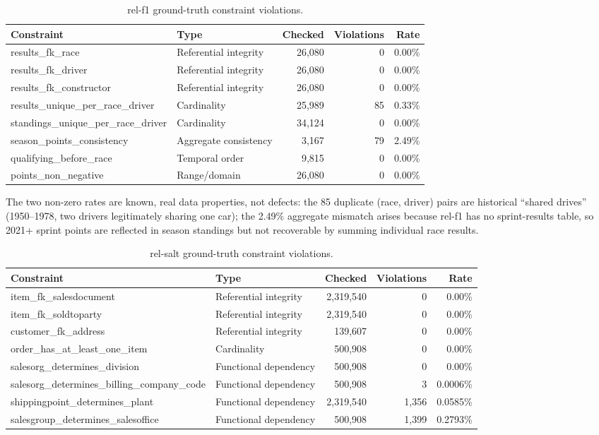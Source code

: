 \documentclass[11pt]{article}
\begin{document}
\begin{table}[h]
\centering
\small
\caption{rel-f1 ground-truth constraint violations.}
\begin{tabular}{@{} l l r r r @{}}
\toprule
\textbf{Constraint} & \textbf{Type} & \textbf{Checked} & \textbf{Violations} & \textbf{Rate} \\
\midrule
results\_fk\_race & Referential integrity & 26{,}080 & 0 & 0.00\% \\
results\_fk\_driver & Referential integrity & 26{,}080 & 0 & 0.00\% \\
results\_fk\_constructor & Referential integrity & 26{,}080 & 0 & 0.00\% \\
results\_unique\_per\_race\_driver & Cardinality & 25{,}989 & 85 & 0.33\% \\
standings\_unique\_per\_race\_driver & Cardinality & 34{,}124 & 0 & 0.00\% \\
season\_points\_consistency & Aggregate consistency & 3{,}167 & 79 & 2.49\% \\
qualifying\_before\_race & Temporal order & 9{,}815 & 0 & 0.00\% \\
points\_non\_negative & Range/domain & 26{,}080 & 0 & 0.00\% \\
\bottomrule
\end{tabular}
\end{table}

The two non-zero rates are known, real data properties, not defects: the 85 duplicate (race,
driver) pairs are historical ``shared drives'' (1950--1978, two drivers legitimately sharing
one car); the 2.49\% aggregate mismatch arises because rel-f1 has no sprint-results table, so
2021+ sprint points are reflected in season standings but not recoverable by summing
individual race results.

\begin{table}[h]
\centering
\small
\caption{rel-salt ground-truth constraint violations.}
\begin{tabular}{@{} l l r r r @{}}
\toprule
\textbf{Constraint} & \textbf{Type} & \textbf{Checked} & \textbf{Violations} & \textbf{Rate} \\
\midrule
item\_fk\_salesdocument & Referential integrity & 2{,}319{,}540 & 0 & 0.00\% \\
item\_fk\_soldtoparty & Referential integrity & 2{,}319{,}540 & 0 & 0.00\% \\
customer\_fk\_address & Referential integrity & 139{,}607 & 0 & 0.00\% \\
order\_has\_at\_least\_one\_item & Cardinality & 500{,}908 & 0 & 0.00\% \\
salesorg\_determines\_division & Functional dependency & 500{,}908 & 0 & 0.00\% \\
salesorg\_determines\_billing\_company\_code & Functional dependency & 500{,}908 & 3 & 0.0006\% \\
shippingpoint\_determines\_plant & Functional dependency & 2{,}319{,}540 & 1{,}356 & 0.0585\% \\
salesgroup\_determines\_salesoffice & Functional dependency & 500{,}908 & 1{,}399 & 0.2793\% \\
\bottomrule
\end{tabular}
\end{table}
\end{document}
